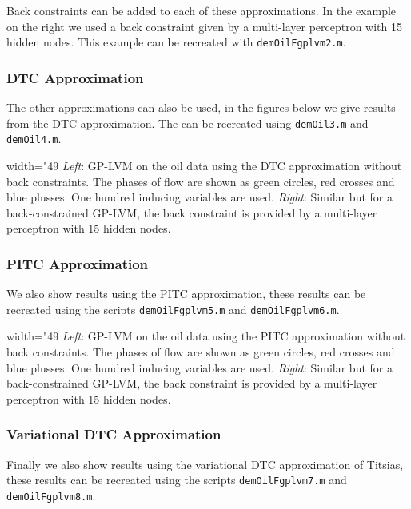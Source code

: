 Back constraints can be added to each of these approximations. In the example on the right we used a back constraint given by a multi-layer perceptron with 15 hidden nodes. This example can be recreated with \texttt{demOilFgplvm2.m}.

\subsubsection{DTC Approximation}

The other approximations can also be used, in the figures below we give results from the DTC approximation. The can be recreated using \texttt{demOil3.m} and \texttt{demOil4.m}.

\begin{center} width="49%
\emph{Left}: GP-LVM on the oil data using the DTC approximation without back constraints. The phases of flow are shown as green circles, red crosses and blue plusses.  One hundred inducing variables are used. \emph{Right}: Similar but for a back-constrained GP-LVM, the back constraint is provided by a multi-layer perceptron with 15 hidden nodes.\end{center}

\subsubsection{PITC Approximation}

We also show results using the PITC approximation, these results can be recreated using the scripts \texttt{demOilFgplvm5.m} and \texttt{demOilFgplvm6.m}.

\begin{center} width="49%
\emph{Left}: GP-LVM on the oil data using the PITC approximation without back constraints. The phases of flow are shown as green circles, red crosses and blue plusses.  One hundred inducing variables are used. \emph{Right}: Similar but for a back-constrained GP-LVM, the back constraint is provided by a multi-layer perceptron with 15 hidden nodes.\end{center}

\subsubsection{Variational DTC Approximation}

Finally we also show results using the variational DTC approximation of Titsias, these results can be recreated using the scripts \texttt{demOilFgplvm7.m} and \texttt{demOilFgplvm8.m}.

